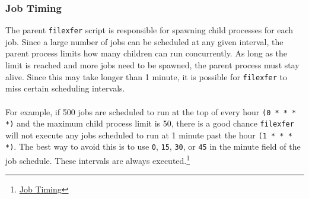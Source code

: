 

\subsubsection{Job Timing}
The parent \texttt{filexfer} script is responsible for spawning
child processes for each job. Since a large number of jobs can be
scheduled at any given interval, the parent process limits how
many children can run concurrently.  As long as the limit is
reached and more jobs need to be spawned, the parent process must
stay alive. Since this may take longer than 1 minute, it is
possible for \texttt{filexfer} to miss certain scheduling
intervals.\\
\\
For example, if 500 jobs are scheduled to run at the top of every
hour \texttt{(0 * * * *)} and the maximum child process limit is
50, there is a good chance \texttt{filexfer} will not execute any
jobs scheduled to run at 1 minute past the hour
\texttt{(1 * * * *)}.  The best way to avoid this is to use
\texttt{0}, \texttt{15}, \texttt{30}, or \texttt{45} in the
minute field of the job schedule.  These intervals are always
executed.\footnote{\href{http://oss-wiki.operations.gci.com/dev/index.php/Scheduling\_Usage\_Collection\_Jobs}{Job
    Timing}}

